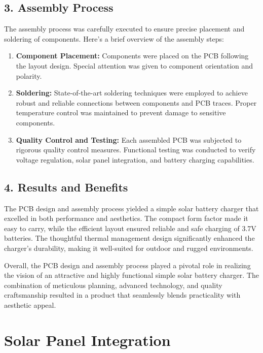 \documentclass[twocolumn]{article}
\begin{document}
\subsection*{3. Assembly Process}

The assembly process was carefully executed to ensure precise placement and soldering of components. Here's a brief overview of the assembly steps:

\begin{enumerate}
  \item \textbf{Component Placement:} Components were placed on the PCB following the layout design. Special attention was given to component orientation and polarity.

  \item \textbf{Soldering:} State-of-the-art soldering techniques were employed to achieve robust and reliable connections between components and PCB traces. Proper temperature control was maintained to prevent damage to sensitive components.

  \item \textbf{Quality Control and Testing:} Each assembled PCB was subjected to rigorous quality control measures. Functional testing was conducted to verify voltage regulation, solar panel integration, and battery charging capabilities.

\end{enumerate}

\subsection*{4. Results and Benefits}

The PCB design and assembly process yielded a simple solar battery charger that excelled in both performance and aesthetics. The compact form factor made it easy to carry, while the efficient layout ensured reliable and safe charging of 3.7V batteries. The thoughtful thermal management design significantly enhanced the charger's durability, making it well-suited for outdoor and rugged environments.

\noindent Overall, the PCB design and assembly process played a pivotal role in realizing the vision of an attractive and highly functional simple solar battery charger. The combination of meticulous planning, advanced technology, and quality craftsmanship resulted in a product that seamlessly blends practicality with aesthetic appeal.

\section*{Solar Panel Integration}
\end{document}
